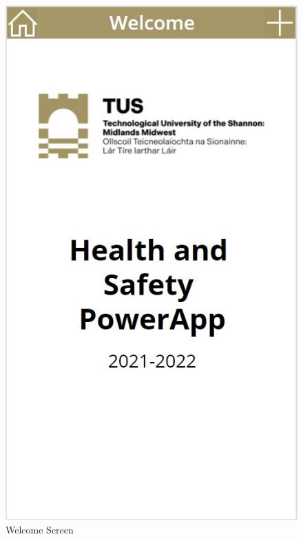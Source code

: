 \begin{figure}
	\centering
	\includegraphics[width=0.7\linewidth]{./WelcomeScreen.jpg}
	\caption{Welcome Screen}
	\label{fig:WelcomeScreen}
\end{figure}


